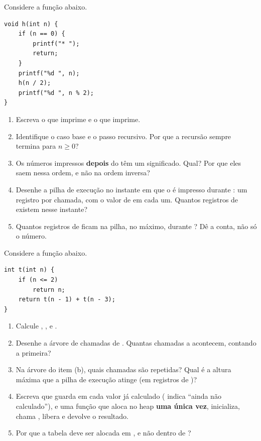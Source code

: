 \documentclass[11pt,a4paper]{article}
\begin{document}
Considere a função abaixo.

\begin{lstlisting}
void h(int n) {
    if (n == 0) {
        printf("* ");
        return;
    }
    printf("%d ", n);
    h(n / 2);
    printf("%d ", n % 2);
}
\end{lstlisting}

\begin{enumerate}[label=(\alph*),leftmargin=1.8em,itemsep=1pt]
  \item Escreva o que  imprime e o que  imprime.
  \item Identifique o caso base e o passo recursivo. Por que a recursão sempre
        termina para $n \ge 0$?
  \item Os números impressos \textbf{depois} do \cd{*} têm um significado. Qual?
        Por que eles saem nessa ordem, e não na ordem inversa?
  \item Desenhe a pilha de execução no instante em que o \cd{*} é impresso durante
        : um registro por chamada, com o valor de  em cada um.
        Quantos registros de  existem nesse instante?
  \item Quantos registros de  ficam na pilha, no máximo, durante ?
        Dê a conta, não só o número.
\end{enumerate}

Considere a função abaixo.

\begin{lstlisting}
int t(int n) {
    if (n <= 2)
        return n;
    return t(n - 1) + t(n - 3);
}
\end{lstlisting}

\begin{enumerate}[label=(\alph*),leftmargin=1.8em,itemsep=1pt]
  \item Calcule , ,  e .
  \item Desenhe a árvore de chamadas de . Quantas chamadas a 
        acontecem, contando a primeira?
  \item Na árvore do item (b), quais chamadas são repetidas? Qual é a altura máxima
        que a pilha de execução atinge (em registros de )?
  \item Escreva  que guarda em  cada
        valor já calculado ( indica ``ainda não calculado''), e uma função
         que aloca  no heap \textbf{uma única vez},
        inicializa, chama , libera e devolve o resultado.
  \item Por que a tabela deve ser alocada em , e não dentro de
        ?
\end{enumerate}
\end{document}
